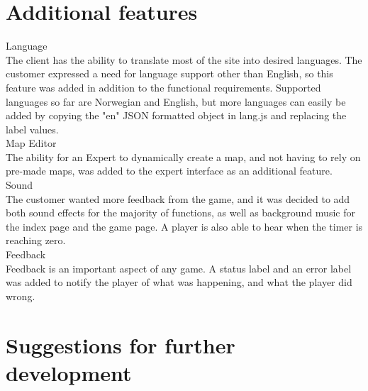 \section{Additional features}

Language\\
The client has the ability to translate most of the site into desired languages. The customer expressed a need for language support other than English, so this feature was added in addition to the functional requirements. Supported languages so far are Norwegian and English, but more languages can easily be added by copying the "en" JSON formatted object in lang.js and replacing the label values.
\\
Map Editor\\
The ability for an Expert to dynamically create a map, and not having to rely on pre-made maps, was added to the expert interface as an additional feature.
\\
Sound \\
The customer wanted more feedback from the game, and it was decided to add both sound effects for the majority of functions, as well as background music for the index page and the game page. A player is also able to hear when the timer is reaching zero.
\\
Feedback \\
Feedback is an important aspect of any game. A status label and an error label was added to notify the player of what was happening, and what the player did wrong.

\section{Suggestions for further development}

